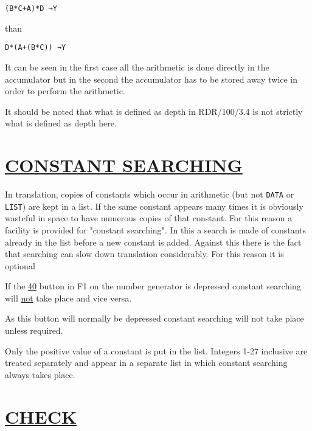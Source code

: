 \documentclass[10pt, a4paper, oneside]{article}
\newcommand{\myuline}[1]{\uline{#1}}
\newcommand{\mytt}[1]{\texttt{\scriptsize #1}}
\newcommand{\mytt}[1]{\texttt{\small #1}}
\begin{document}
\begin{multicols}{2}
\begin{addmargin}[1cm]{1em}%
\begin{lstlisting}
(B*C+A)*D →Y
\end{lstlisting}
\end{addmargin}

\begin{flushleft}
than
\end{flushleft}

\begin{addmargin}[1cm]{1em}%
\begin{lstlisting}
D*(A+(B*C)) →Y
\end{lstlisting}
\end{addmargin}

It can be seen in the first case all the
arithmetic is done directly in the accumulator but in
the second the accumulator has to be stored away twice
in order to perform the arithmetic.

It should be noted that what is defined as depth
in RDR/100/3.4 is not strictly what is defined as
depth here.


\section{\myuline{CONSTANT SEARCHING}}

In translation, copies of constants which occur in
arithmetic (but not \mytt{DATA} or \mytt{LIST}) are kept in a list.
If the same constant appears many times it is obviously
wasteful in space to have numerous copies of that
constant.  For this reason a facility is provided
for "constant searching".  In this a search is made
of constants already in the list before a new constant
is added.  Against this there is the fact that
searching can slow down translation considerably.
For this reason it is optional

If the \myuline{40} button in F1 on the number generator
is depressed constant searching will \myuline{not} take place
and vice versa.

As this button will normally be depressed constant
searching will not take place unless required.

Only the positive value of a constant is put in
the list.  Integers 1-27 inclusive are treated
separately and appear in a separate list in which
constant searching always takes place.


\section{\myuline{CHECK}}


\end{multicols}
\end{document}
